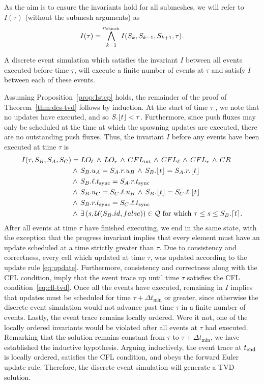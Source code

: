 As the aim is to ensure the invariants hold for all submeshes, we will refer to $I(\tau)$ (without the submesh arguments) as
\begin{equation*}
I(\tau) = \bigwedge_{k=1}^{n_{\text{sbmsh}}} I(S_k, S_{k-1}, S_{k+1}, \tau).
\end{equation*}
\begin{proposition}
A discrete event simulation which satisfies the invariant $I$ between all events executed before time $\tau$, will execute a finite number of events at $\tau$ and satisfy $I$ between each of these events.
\label{prop:1step}
\end{proposition}
Assuming Proposition~\ref{prop:1step} holds, the remainder of the proof of Theorem~\ref{thm:des-tvd} follows by induction. At the start of time $\tau$ , we note that no updates have executed, and so $S.\lfloor t \rfloor < \tau$. Furthermore, since push fluxes may only be scheduled at the time at which the spawning updates are executed, there are no outstanding push fluxes. Thus, the invariant $I$ before any events have been executed at time $\tau$ is
\begin{align*}
I(\tau, S_B, S_A, S_C) &= LO_{\ell} \,\land\,LO_r\,\land\,CFL_{\text{int}} \,\land\,CFL_{\ell}\,\land\,CFL_r\,\land\,CR\\
&\land\,S_B.u_A = S_A.r.u_B \,\land\,S_B.\lfloor t \rfloor = S_A.r.\lfloor t \rfloor\\
&\land\,S_B.\ell.t_{\text{sync}} = S_A.r.t_{\text{sync}}\\
&\land\,S_B.u_C=S_C.\ell.u_B\,\land\,S_B.\lfloor t \rfloor =S_C.\ell.\lfloor t \rfloor\\
&\land\,S_B.r.t_{\text{sync}} = S_C.\ell.t_{\text{sync}}\\
&\land\,\exists\,(s,\mathcal{U}(S_B.id, false)) \in \mathcal{Q} \text{ for which } \tau \le s \le S_B.\lceil t \rceil.
\end{align*}
After all events at time $\tau$ have finished executing, we end in the same state, with the exception that the progress invariant implies that every element must have an update scheduled at a time strictly greater than $\tau$. Due to consistency and correctness, every cell which updated at time $\tau$, was updated according to the update rule \eqref{eq:update}. Furthermore, consistency and correctness along with the CFL condition, imply that the event trace up until time $\tau$ satisfies the CFL condition~\eqref{eq:cfl-tvd}. Once all the events have executed, remaining in $I$ implies that updates must be scheduled for time $\tau+\Delta t_{\min}$ or greater, since otherwise the discrete event simulation would not advance past time $\tau$ in a finite number of events. Lastly, the event trace remains locally ordered. Were it not, one of the locally ordered invariants would be violated after all events at $\tau$ had executed. Remarking that the solution remains constant from $\tau$ to $\tau + \Delta t_{\min}$, we have established the inductive hypothesis. Arguing inductively, the event trace at $t_{\text{end}}$ is locally ordered, satisfies the CFL condition, and obeys the forward Euler update rule. Therefore, the discrete event simulation will generate a TVD solution.
